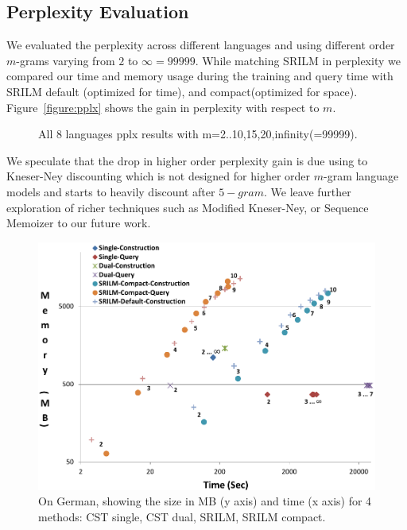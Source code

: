 \subsection{Perplexity Evaluation}
We evaluated the perplexity across different languages and using different order $m$-grams varying from $2$ to $\infty=99999$. While matching SRILM in perplexity we compared our time and memory usage during the training and query time with SRILM default (optimized for time), and compact(optimized for space). Figure~\ref{figure:pplx} shows the gain in perplexity with respect to $m$. 
\begin{figure}

\caption{All 8 languages pplx results with m=2..10,15,20,infinity(=99999).}
\end{figure}\label{figure:pplx}
We speculate that the drop in higher order perplexity gain is due using to Kneser-Ney discounting which is not designed for higher order $m$-gram language models and starts to heavily discount after $5-gram$. We leave further exploration of richer techniques such as Modified Kneser-Ney, or Sequence Memoizer to our future work. 
\begin{figure}
\includegraphics[width=\columnwidth]{figures/Time-Space.pdf}
\caption{On German, showing the size in MB (y axis) and time (x axis) for 4 methods: CST single, CST dual, SRILM, SRILM compact.}
\end{figure}









